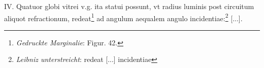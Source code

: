 \pend \pstart [p.~60] IV. Quatuor globi vitrei v.g. ita statui possunt, vt radius luminis post circuitum aliquot refractionum, redeat\footnote{\textit{Gedruckte Marginalie}: Figur. 42.} ad angulum aequalem angulo incidentiae:\footnote{\textit{Leibniz unterstreicht}: redeat [...] incidentiae} [...].